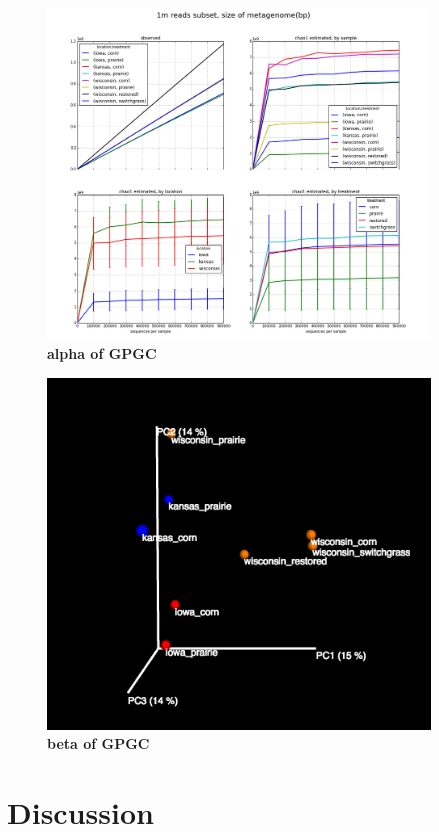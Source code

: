 \documentclass{article}
\begin{document}



\begin{figure}[!ht]
 \centerline{\includegraphics[width=4in]{./figures/GPGC_1m_old.png}}
\caption{\bf alpha of GPGC}
\label{fig:concept}
\end{figure}



\begin{figure}[!ht]
 \centerline{\includegraphics[width=4in]{./figures/GPGC_old_subset1M.png}}
\caption{\bf beta of GPGC}
\label{fig:concept}
\end{figure}



\section{Discussion}
\end{document}
